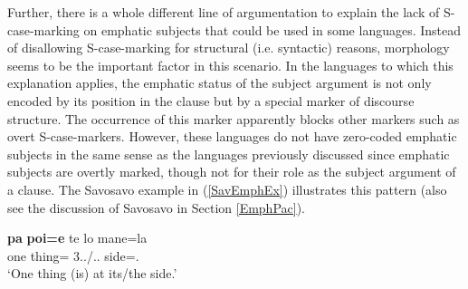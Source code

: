 Further, there is a whole different line of argumentation to explain the lack of S-case-marking on emphatic subjects that could be used in some languages. 
Instead of disallowing S-case-marking for structural (i.e. syntactic) reasons, morphology seems to be the important factor in this scenario. 
In the languages to which this explanation applies, the emphatic status of the subject argument is not only encoded by its position in the clause but by a special marker of discourse structure. 
The occurrence of this marker apparently blocks other markers such as overt S-case-markers. 
However, these languages do not have zero-coded emphatic subjects in the same sense as the languages previously discussed since emphatic subjects are overtly marked, though not for their role as the subject argument of a clause.
The Savosavo example in (\ref{SavEmphEx}) illustrates this pattern (also see the discussion of Savosavo in Section \ref{EmphPac}).

\begin{exe}\ex\label{SavEmphEx}
\gll \textbf{pa} \textbf{poi=e} te lo mane=la\\
one thing=\emphat{} \emphat{} 3\sg{}.\mas{}.\gen{}/\deter{}.\sg{}.\mas{} side=\loc{}.\mas{}\\ 
\glt `One thing (is) at its/the side.'
\end{exe}
 




